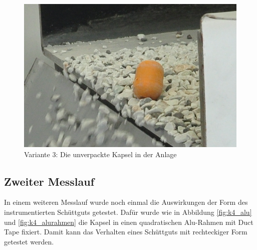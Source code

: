 \begin{figure}[htb]
	\centering
	\begin{minipage}[t]{0.49\linewidth}
		\centering
		\includegraphics[width=1\linewidth]{images/k4-kapsel.JPG}
		\caption{Variante 3: Die unverpackte Kapsel in der Anlage}
		\label{fig:k4_kapsel}
	\end{minipage}%
\end{figure}

\subsection{Zweiter Messlauf}

In einem weiteren Messlauf wurde noch einmal die Auswirkungen der Form des instrumentierten Schüttguts getestet. Dafür wurde wie in Abbildung \ref{fig:k4_alu} und \ref{fig:k4_alurahmen} die Kapsel in einen quadratischen Alu-Rahmen  mit Duct Tape fixiert. Damit kann das Verhalten eines Schüttguts mit rechteckiger Form getestet werden. 

